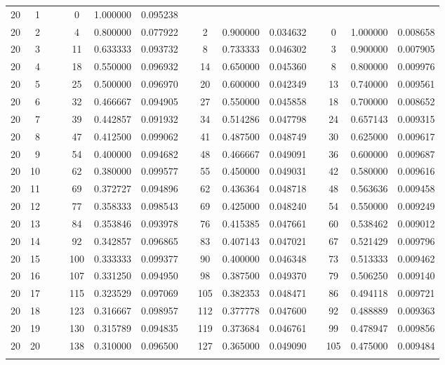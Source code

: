 \begin{appendix}
\begin{longtable}[h]{rrrcccccccccccc}
20	&	1	&&&	0	&	1.000000	&	0.095238	&&		&		&		&&		&		&		\\
20	&	2	&&&	4	&	0.800000	&	0.077922	&&	2	&	0.900000	&	0.034632	&&	0	&	1.000000	&	0.008658	\\
20	&	3	&&&	11	&	0.633333	&	0.093732	&&	8	&	0.733333	&	0.046302	&&	3	&	0.900000	&	0.007905	\\
20	&	4	&&&	18	&	0.550000	&	0.096932	&&	14	&	0.650000	&	0.045360	&&	8	&	0.800000	&	0.009976	\\
20	&	5	&&&	25	&	0.500000	&	0.096970	&&	20	&	0.600000	&	0.042349	&&	13	&	0.740000	&	0.009561	\\
20	&	6	&&&	32	&	0.466667	&	0.094905	&&	27	&	0.550000	&	0.045858	&&	18	&	0.700000	&	0.008652	\\
20	&	7	&&&	39	&	0.442857	&	0.091932	&&	34	&	0.514286	&	0.047798	&&	24	&	0.657143	&	0.009315	\\
20	&	8	&&&	47	&	0.412500	&	0.099062	&&	41	&	0.487500	&	0.048749	&&	30	&	0.625000	&	0.009617	\\
20	&	9	&&&	54	&	0.400000	&	0.094682	&&	48	&	0.466667	&	0.049091	&&	36	&	0.600000	&	0.009687	\\
20	&	10	&&&	62	&	0.380000	&	0.099577	&&	55	&	0.450000	&	0.049031	&&	42	&	0.580000	&	0.009616	\\
20	&	11	&&&	69	&	0.372727	&	0.094896	&&	62	&	0.436364	&	0.048718	&&	48	&	0.563636	&	0.009458	\\
20	&	12	&&&	77	&	0.358333	&	0.098543	&&	69	&	0.425000	&	0.048240	&&	54	&	0.550000	&	0.009249	\\
20	&	13	&&&	84	&	0.353846	&	0.093978	&&	76	&	0.415385	&	0.047661	&&	60	&	0.538462	&	0.009012	\\
20	&	14	&&&	92	&	0.342857	&	0.096865	&&	83	&	0.407143	&	0.047021	&&	67	&	0.521429	&	0.009796	\\
20	&	15	&&&	100	&	0.333333	&	0.099377	&&	90	&	0.400000	&	0.046348	&&	73	&	0.513333	&	0.009462	\\
20	&	16	&&&	107	&	0.331250	&	0.094950	&&	98	&	0.387500	&	0.049370	&&	79	&	0.506250	&	0.009140	\\
20	&	17	&&&	115	&	0.323529	&	0.097069	&&	105	&	0.382353	&	0.048471	&&	86	&	0.494118	&	0.009721	\\
20	&	18	&&&	123	&	0.316667	&	0.098957	&&	112	&	0.377778	&	0.047600	&&	92	&	0.488889	&	0.009363	\\
20	&	19	&&&	130	&	0.315789	&	0.094835	&&	119	&	0.373684	&	0.046761	&&	99	&	0.478947	&	0.009856	\\
20	&	20	&&&	138	&	0.310000	&	0.096500	&&	127	&	0.365000	&	0.049090	&&	105	&	0.475000	&	0.009484	\\ \hline
\vspace{0.02cm}
\end{longtable}



\end{appendix}
